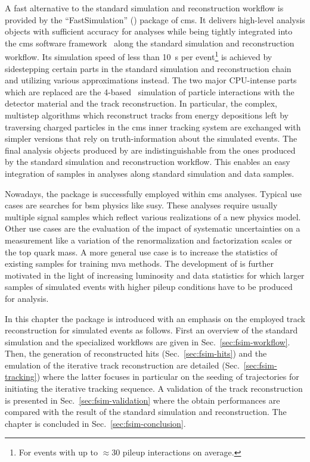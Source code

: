A fast alternative to the standard simulation and reconstruction workflow is provided by the ``FastSimulation'' (\FSIM[format=hyperbf]) package of \gls{cms}. It delivers high-level analysis objects with sufficient accuracy for analyses while being tightly integrated into the \gls{cms} software framework~\cite{Bayatian:922757} along the standard simulation and reconstruction workflow. Its simulation speed of less than 10~s per event\footnote{For events with up to $\approx30$ pileup interactions on average.} is achieved by sidestepping certain parts in the standard simulation and reconstruction chain and utilizing various approximations instead. The two major CPU-intense parts which are replaced are the \GEANT{}4-based~\cite{Agostinelli2003250} simulation of particle interactions with the detector material and the track reconstruction. In particular, the complex, multistep algorithms which reconstruct tracks from energy depositions left by traversing charged particles in the \gls{cms} inner tracking system are exchanged with simpler versions that rely on truth-information about the simulated events. The final analysis objects produced by \FSIM are indistinguishable from the ones produced by the standard simulation and reconstruction workflow. This enables an easy integration of \FSIM samples in analyses along standard simulation and data samples.

Nowadays, the \FSIM package is successfully employed within \gls{cms} analyses. Typical use cases are searches for \acrfull{bsm} physics like \acrfull{susy}. These analyses require usually multiple signal samples which reflect various realizations of a new physics model. Other use cases are the evaluation of the impact of systematic uncertainties on a measurement like a variation of the renormalization and factorization scales or the top quark mass. A more general use case is to increase the statistics of existing samples for training \acrfull{mva} methods. The development of \FSIM is further motivated in the light of increasing luminosity and data statistics for which larger samples of simulated events with higher pileup conditions have to be produced for analysis.

In this chapter the \FSIM package is introduced with an emphasis on the employed track reconstruction for simulated events as follows. First an overview of the standard simulation and the specialized \FSIM workflows are given in Sec.~\ref{sec:fsim-workflow}. Then, the generation of reconstructed hits (Sec.~\ref{sec:fsim-hits}) and the emulation of the iterative track reconstruction are detailed (Sec.~\ref{sec:fsim-tracking}) where the latter focuses in particular on the seeding of trajectories for initiating the iterative tracking sequence. A validation of the track reconstruction is presented in Sec.~\ref{sec:fsim-validation} where the obtain performances are compared with the result of the standard simulation and reconstruction. The chapter is concluded in Sec.~\ref{sec:fsim-conclusion}.


